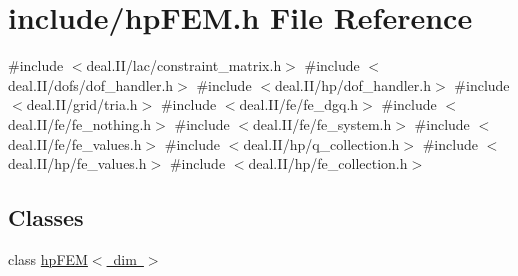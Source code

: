 \section{include/hp\+F\+EM.h File Reference}
\label{hp_f_e_m_8h}
{\ttfamily \#include $<$deal.\+I\+I/lac/constraint\+\_\+matrix.\+h$>$}\newline
{\ttfamily \#include $<$deal.\+I\+I/dofs/dof\+\_\+handler.\+h$>$}\newline
{\ttfamily \#include $<$deal.\+I\+I/hp/dof\+\_\+handler.\+h$>$}\newline
{\ttfamily \#include $<$deal.\+I\+I/grid/tria.\+h$>$}\newline
{\ttfamily \#include $<$deal.\+I\+I/fe/fe\+\_\+dgq.\+h$>$}\newline
{\ttfamily \#include $<$deal.\+I\+I/fe/fe\+\_\+nothing.\+h$>$}\newline
{\ttfamily \#include $<$deal.\+I\+I/fe/fe\+\_\+system.\+h$>$}\newline
{\ttfamily \#include $<$deal.\+I\+I/fe/fe\+\_\+values.\+h$>$}\newline
{\ttfamily \#include $<$deal.\+I\+I/hp/q\+\_\+collection.\+h$>$}\newline
{\ttfamily \#include $<$deal.\+I\+I/hp/fe\+\_\+values.\+h$>$}\newline
{\ttfamily \#include $<$deal.\+I\+I/hp/fe\+\_\+collection.\+h$>$}\newline
\subsection*{Classes}
\begin{DoxyCompactItemize}
\item 
class \mbox{\hyperlink{classhp_f_e_m}{hp\+F\+E\+M$<$ dim $>$}}
\end{DoxyCompactItemize}
